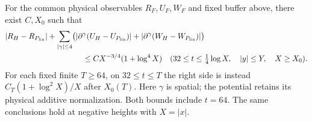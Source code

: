 \begin{theorem}
\label{thm:linear-static}
For the common physical observables $R_F,U_F,W_F$ and fixed buffer above,
there exist $C,X_0$ such that
\begin{align}
 &|R_H-R_{P_{\rm lin}}|
 +\sum_{|\gamma|\le4}\bigl(
 |\partial^\gamma(U_H-U_{P_{\rm lin}})|
 +|\partial^\gamma(W_H-W_{P_{\rm lin}})|\bigr)
 \notag\\
 &\hspace{35mm}\le C X^{-3/4}(1+\log^4X)
 \quad(32\le t\le\tfrac14\log X,\quad |y|\le Y,\quad X\ge X_0).
 \label{eq:linear-static-joint}
\end{align}
For each fixed finite $T\ge64$, on $32\le t\le T$ the right side is
instead $C_T(1+\log^2X)/X$ after $X_0(T)$.  Here $\gamma$ is spatial;
the potential retains its physical additive normalization.  Both bounds
include $t=64$.  The same conclusions hold at negative heights with
$X=|x|$.
\end{theorem}
